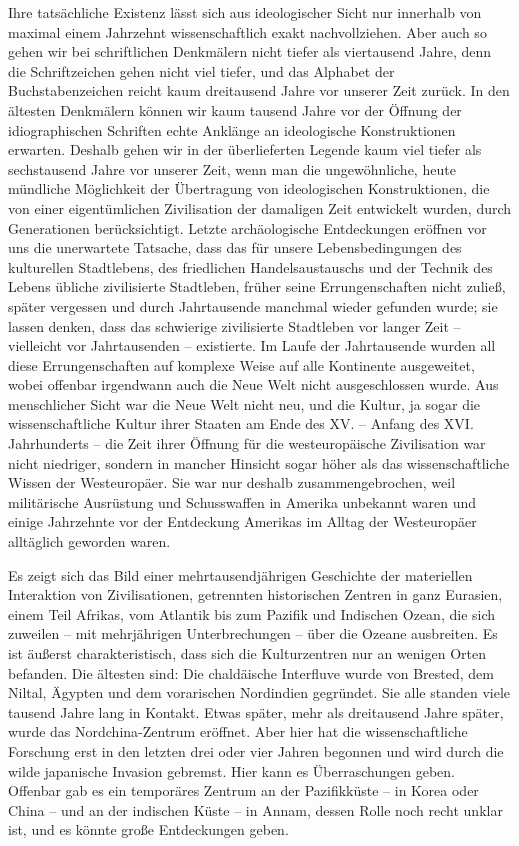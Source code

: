 \documentclass[11pt,a4paper]{book}
\begin{document}
Ihre tatsächliche Existenz lässt sich aus ideologischer Sicht nur innerhalb von maximal einem Jahrzehnt wissenschaftlich exakt nachvollziehen. Aber auch so gehen wir bei schriftlichen Denkmälern nicht tiefer als viertausend Jahre, denn die Schriftzeichen gehen nicht viel tiefer, und das Alphabet der Buchstabenzeichen reicht kaum dreitausend Jahre vor unserer Zeit zurück. In den ältesten Denkmälern können wir kaum tausend Jahre vor der Öffnung der idiographischen Schriften echte Anklänge an ideologische Konstruktionen erwarten. Deshalb gehen wir in der überlieferten Legende kaum viel tiefer als sechstausend Jahre vor unserer Zeit, wenn man die ungewöhnliche, heute mündliche Möglichkeit der Übertragung von ideologischen Konstruktionen, die von einer eigentümlichen Zivilisation der damaligen Zeit entwickelt wurden, durch Generationen berücksichtigt. Letzte archäologische Entdeckungen eröffnen vor uns die unerwartete Tatsache, dass das für unsere Lebensbedingungen des kulturellen Stadtlebens, des friedlichen Handelsaustauschs und der Technik des Lebens übliche zivilisierte Stadtleben, früher seine Errungenschaften nicht zuließ, später vergessen und durch Jahrtausende manchmal wieder gefunden wurde; sie lassen denken, dass das schwierige zivilisierte Stadtleben vor langer Zeit -- vielleicht vor Jahrtausenden -- existierte. Im Laufe der Jahrtausende wurden all diese Errungenschaften auf komplexe Weise auf alle Kontinente ausgeweitet, wobei offenbar irgendwann auch die Neue Welt nicht ausgeschlossen wurde. Aus menschlicher Sicht war die Neue Welt nicht neu, und die Kultur, ja sogar die wissenschaftliche Kultur ihrer Staaten am Ende des XV. -- Anfang des XVI. Jahrhunderts -- die Zeit ihrer Öffnung für die westeuropäische Zivilisation war nicht niedriger, sondern in mancher Hinsicht sogar höher als das wissenschaftliche Wissen der Westeuropäer. Sie war nur deshalb zusammengebrochen, weil militärische Ausrüstung und Schusswaffen in Amerika unbekannt waren und einige Jahrzehnte vor der Entdeckung Amerikas im Alltag der Westeuropäer alltäglich geworden waren. 

Es zeigt sich das Bild einer mehrtausendjährigen Geschichte der materiellen Interaktion von Zivilisationen, getrennten historischen Zentren in ganz Eurasien, einem Teil Afrikas, vom Atlantik bis zum Pazifik und Indischen Ozean, die sich zuweilen -- mit mehrjährigen Unterbrechungen -- über die Ozeane ausbreiten. Es ist äußerst charakteristisch, dass sich die Kulturzentren nur an wenigen Orten befanden. Die ältesten sind: Die chaldäische Interfluve wurde von Brested, dem Niltal, Ägypten und dem vorarischen Nordindien gegründet. Sie alle standen viele tausend Jahre lang in Kontakt. Etwas später, mehr als dreitausend Jahre später, wurde das Nordchina-Zentrum eröffnet. Aber hier hat die wissenschaftliche Forschung erst in den letzten drei oder vier Jahren begonnen und wird durch die wilde japanische Invasion gebremst. Hier kann es Überraschungen geben. Offenbar gab es ein temporäres Zentrum an der Pazifikküste -- in Korea oder China -- und an der indischen Küste -- in Annam, dessen Rolle noch recht unklar ist, und es könnte große Entdeckungen geben. 
\end{document}
